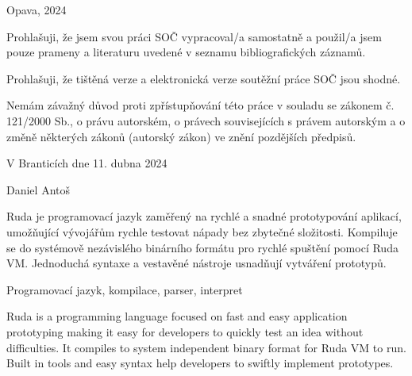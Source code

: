 \documentclass[12pt, a4paper,
twoside,        %
openright
]{report}
\newcommand\city{Opava} %
\newcommand\authorName{Daniel Antoš}  %
\newcommand\publicationYear{2024} %
\begin{document}
	\noindent \city, \publicationYear
	
	\cleardoublepage

	
	\noindent Prohlašuji, že jsem svou práci SOČ vypracoval/a samostatně a použil/a jsem pouze prameny a literaturu uvedené v seznamu bibliografických záznamů.
	
	\noindent Prohlašuji, že tištěná verze a elektronická verze soutěžní práce SOČ jsou shodné. 
	
	\noindent Nemám závažný důvod proti zpřístupňování této práce v souladu se zákonem č. 121/2000 Sb., o právu autorském, o právech souvisejících s právem autorským a o změně některých zákonů (autorský zákon) ve znění pozdějších předpisů. 
	
	\vspace{24 pt}
	
	\noindent V Branticích dne 11. dubna 2024 \dotfill{} 
	
	\hspace{8cm} \authorName
	
	\cleardoublepage
	
	
		\noindent 
		Ruda je programovací jazyk zaměřený na rychlé a snadné prototypování aplikací, umožňující vývojářům rychle testovat nápady bez zbytečné složitosti. Kompiluje se do systémově nezávislého binárního formátu pro rychlé spuštění pomocí Ruda VM. Jednoduchá syntaxe a vestavěné nástroje usnadňují vytváření prototypů.
		
		\vspace{18pt}
		
		
		\noindent Programovací jazyk, kompilace, parser, interpret
		
		\vspace{18pt}
		
		
		\noindent 
		Ruda is a programming language focused on fast and easy application prototyping making it easy for developers to quickly test an idea without difficulties. It compiles to system independent binary format for Ruda VM to run. Built in tools and easy syntax help developers to swiftly implement prototypes.
		
\end{document}

